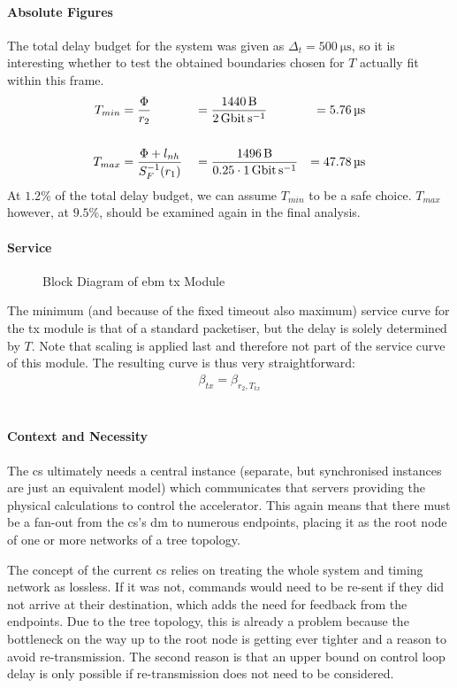 \paragraph{Absolute Figures}
The total delay budget for the system was given as $\Delta_t = \SI{500}{\micro\second}$, so it is interesting whether to test the obtained boundaries chosen for $T$ actually fit within this frame.
\begin{align}
T_{min} &=\frac{\Phi}{r_2} &&= \frac{\SI{1440}{\byte}}{ \SI{2}{\giga\bit\per\second}} &= \SI{5.76}{\micro\second}\\
\notag\\
T_{max} &= \frac{\Phi + l_{nh}}{S^{-1}_F(r_1)} &&= \frac{\SI{1496}{\byte}}{0.25 \cdot \SI{1}{\giga\bit\per\second}} &= \SI{47.78}{\micro\second}
\end{align}
At $1.2\%$ of the total delay budget, we can assume $T_{min}$ to be a safe choice. $T_{max}$ however, at $9.5\%$, should be
examined again in the final analysis.
\paragraph{Service}

\begin{figure}[H]
  \centering
  \def\svgwidth{0.6875\textwidth}
  
  \caption{Block Diagram of \gls{ebm} \gls{tx} Module}
  \label{fig:tx}
\end{figure}
\noindent
The minimum (and because of the fixed timeout also maximum) service curve for the \gls{tx} module is that of a standard packetiser, but the delay is solely determined by $T$.
Note that scaling is applied last and therefore not part of the service curve of this module.
The resulting curve is thus very straightforward:
%
\begin{align}
\beta_{tx} = \beta_{r_2, T_{tx}}
\end{align}
%
\section{}
\label{sec:fec}
\paragraph{Context and Necessity}
The  \gls{cs} ultimately needs a central instance (separate, but synchronised instances are just an equivalent model) which communicates that servers providing the physical calculations to control the accelerator.
This again means that there must be a fan-out from the  \gls{cs}'s \gls{dm} to numerous endpoints, placing it as the root node of one or more networks of a tree topology.
\par
The concept of the current  \gls{cs} relies on treating the whole system and timing network as lossless.
If it was not, commands would need to be re-sent if they did not arrive at their destination, which adds the need for feedback from the endpoints.
Due to the tree topology, this is already a problem because the bottleneck on the way up to the root node is getting ever tighter and a reason to avoid re-transmission.
The second reason is that an upper bound on control loop delay is only possible if re-transmission does not need to be considered.
